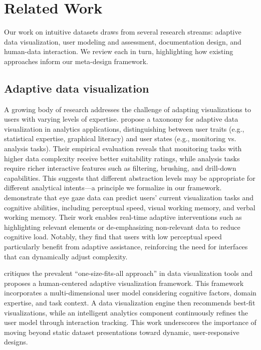 \documentclass[Afour,times,sageh]{sagej}
\begin{document}
\section{Related Work}
\label{sec:related-work}

Our work on intuitive datasets draws from several research streams: adaptive data visualization, user modeling and assessment, documentation design, and human-data interaction. We review each in turn, highlighting how existing approaches inform our meta-design framework.

\subsection{Adaptive data visualization}

A growing body of research addresses the challenge of adapting visualizations to users with varying levels of expertise. \citet{poetzsch2020towardataxonomy} propose a taxonomy for adaptive data visualization in analytics applications, distinguishing between user traits (e.g., statistical expertise, graphical literacy) and user states (e.g., monitoring vs. analysis tasks). Their empirical evaluation reveals that monitoring tasks with higher data complexity receive better suitability ratings, while analysis tasks require richer interactive features such as filtering, brushing, and drill-down capabilities. This suggests that different abstraction levels may be appropriate for different analytical intents---a principle we formalize in our framework.
\vspace{1em}
\noindent \citet{steichen2013useradaptiveinformationvisualization} demonstrate that eye gaze data can predict users' current visualization tasks and cognitive abilities, including perceptual speed, visual working memory, and verbal working memory. Their work enables real-time adaptive interventions such as highlighting relevant elements or de-emphasizing non-relevant data to reduce cognitive load. Notably, they find that users with low perceptual speed particularly benefit from adaptive assistance, reinforcing the need for interfaces that can dynamically adjust complexity.

\vspace{1em}

\noindent \citet{amyrotos2021adaptivevisualizationsfor} critiques the prevalent ``one-size-fits-all approach'' in data visualization tools and proposes a human-centered adaptive visualization framework. This framework incorporates a multi-dimensional user model considering cognitive factors, domain expertise, and task context. A data visualization engine then recommends best-fit visualizations, while an intelligent analytics component continuously refines the user model through interaction tracking. This work underscores the importance of moving beyond static dataset presentations toward dynamic, user-responsive designs.
\end{document}
